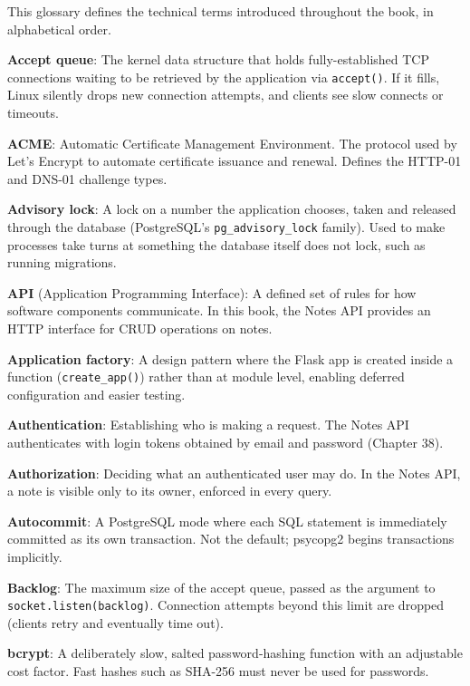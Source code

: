 \label{ch:44-appendices-2}

\chapterrule

This glossary defines the technical terms introduced throughout the book, in alphabetical order.

\textbf{Accept queue}: The kernel data structure that holds fully-established TCP connections waiting to be retrieved by the application via \texttt{accept()}. If it fills, Linux silently drops new connection attempts, and clients see slow connects or timeouts.

\textbf{ACME}: Automatic Certificate Management Environment. The protocol used by Let's Encrypt to automate certificate issuance and renewal. Defines the HTTP-01 and DNS-01 challenge types.

\textbf{Advisory lock}: A lock on a number the application chooses, taken and released through the database (PostgreSQL's \texttt{pg\_advisory\_lock} family). Used to make processes take turns at something the database itself does not lock, such as running migrations.

\textbf{API} (Application Programming Interface): A defined set of rules for how software components communicate. In this book, the Notes API provides an HTTP interface for CRUD operations on notes.

\textbf{Application factory}: A design pattern where the Flask app is created inside a function (\texttt{create\_app()}) rather than at module level, enabling deferred configuration and easier testing.

\textbf{Authentication}: Establishing who is making a request. The Notes API authenticates with login tokens obtained by email and password (Chapter 38).

\textbf{Authorization}: Deciding what an authenticated user may do. In the Notes API, a note is visible only to its owner, enforced in every query.

\textbf{Autocommit}: A PostgreSQL mode where each SQL statement is immediately committed as its own transaction. Not the default; psycopg2 begins transactions implicitly.

\textbf{Backlog}: The maximum size of the accept queue, passed as the argument to \texttt{socket.listen(backlog)}. Connection attempts beyond this limit are dropped (clients retry and eventually time out).

\textbf{bcrypt}: A deliberately slow, salted password-hashing function with an adjustable cost factor. Fast hashes such as SHA-256 must never be used for passwords.

